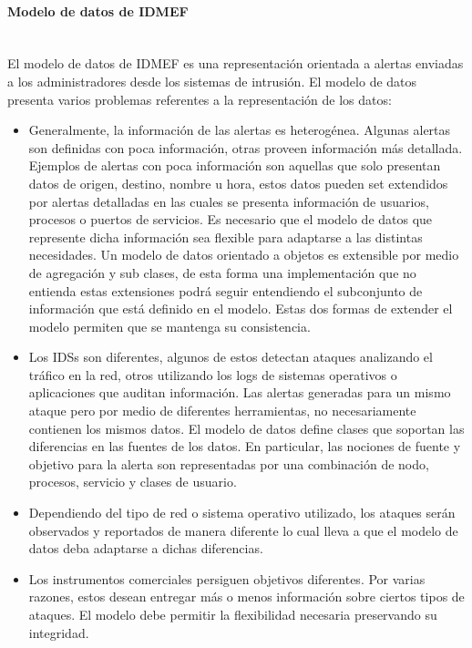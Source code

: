 \paragraph{Modelo de datos de IDMEF}\ \\
El modelo de datos de IDMEF es una representación orientada a alertas enviadas a 
los administradores desde los sistemas de intrusión. El modelo de datos presenta 
varios problemas referentes a la representación de los datos:
\begin{itemize}
  \item Generalmente, la información de las alertas es heterogénea. Algunas 
  alertas son definidas con poca información, otras proveen información más 
  detallada. Ejemplos de alertas con poca información son aquellas que solo 
  presentan datos de origen, destino, nombre u hora, estos datos pueden set 
  extendidos por alertas detalladas en las cuales se presenta información de 
  usuarios, procesos o puertos de servicios. Es necesario que el modelo de datos 
  que represente dicha información sea flexible para adaptarse a las distintas 
  necesidades. Un modelo de datos orientado a objetos es extensible por medio de 
  agregación y sub clases, de esta forma una implementación que no entienda 
  estas extensiones podrá seguir entendiendo el subconjunto de información que 
  está definido en el modelo. Estas dos formas de extender el modelo permiten 
  que se mantenga su consistencia.
  \item Los IDSs son diferentes, algunos de estos detectan ataques analizando el 
  tráfico en la red, otros utilizando los logs de sistemas operativos o 
  aplicaciones que auditan información. Las alertas generadas para un mismo 
  ataque pero por medio de diferentes herramientas, no necesariamente contienen 
  los mismos datos. El modelo de datos define clases que soportan las 
  diferencias en las fuentes de los datos. En particular, las nociones de 
  fuente y objetivo para la alerta son representadas por una combinación de 
  nodo, procesos, servicio y clases de usuario.
  \item Dependiendo del tipo de red o sistema operativo utilizado, los 
  ataques serán observados y reportados de manera diferente lo cual lleva a que 
  el modelo de datos deba adaptarse a dichas diferencias.
  \item Los instrumentos comerciales persiguen objetivos diferentes. Por varias 
  razones, estos desean entregar más o menos información sobre ciertos tipos de 
  ataques. El modelo debe permitir la flexibilidad necesaria preservando su 
  integridad.
\end{itemize}


